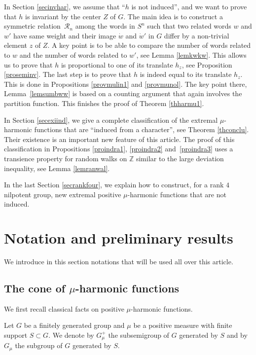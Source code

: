 \documentclass[JEP,XML,SOM,Unicode]{cedram}
\let\mathcal\mathscr
\theoremstyle{definition}
\newcommand{\m}[1]{\mathbb{ #1}}
\newcommand{\mc}[1]{\mathcal{ #1}}
\let\bq\relax
\let\eq\relax
\begin{document}
In Section \ref{secinvhar}, we assume that ``$h$ is not induced'',
and we want to prove that $h$ is invariant by the center $Z$ of $G$.
The main idea is to construct a symmetric relation~$\mc R_n$
among the words in $S^n$ such that
two related words $w$ and $w'$ have same weight
and their image $\dot{w}$ and $\dot{w}'$ in $G$
differ by a non-trivial element $z$ of $Z$.
A key point is to be able to compare the number of words related to $w$
and the number of words related to $w'$, see Lemma \ref{lemkwkw}. This allows
us to prove that $h$ is proportional to one of its translate $h_z$,
see Proposition \ref{proseminv}.
The last step is to prove that $h$ is indeed equal to its translate $h_z$.
This is done in Propositions \ref{provmulin1} and \ref{provmunol}.
The key point there, Lemma~\ref{lemsumbww} is based
on a counting argument that again involves the partition function.
This finishes the proof of Theorem \ref{thharmu1}.

In Section \ref{secexiind}, we give a complete classification of the
extremal $\mu$-harmonic functions that are ``induced
from a character'',
see Theorem \ref{thconclu}.
Their existence is an important new feature of this article.
The proof of this classification in Propositions \ref{proindra1}, \ref{proindra2} and~\ref{proindra3}
uses a transience property for random walks on $\m Z$
similar to the large deviation inequality, see Lemma \ref{lemranwal}.

In the last Section \ref{secrankfour}, we explain how to construct,
for a rank $4$ nilpotent group,
new extremal positive $\mu$-harmonic
functions that are not induced.

\section{Notation and preliminary results}
\label{secnotpre}

We introduce in this section notations
that will be used all over
this article.

\subsection{The cone of $\mu$-harmonic functions}
\label{secconhar}

\bq
We first recall classical facts on positive $\mu$-harmonic functions.
\eq

Let $G$ be a finitely generated group and $\mu$ be a positive
measure with finite support $S\subset G$.
We denote by $G_\mu^+$ the subsemigroup of $G$ generated by $S$
and by $G_\mu$ the subgroup of $G$ generated by $S$.
\end{document}
